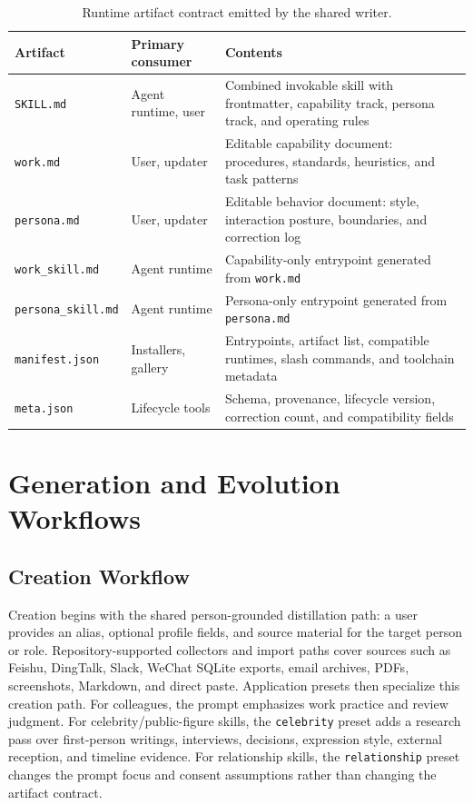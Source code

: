\documentclass{article}
\begin{document}
\begin{table}[t]
\centering
\small
\caption{Runtime artifact contract emitted by the shared writer.}
\label{tab:artifact-contract}
\begin{tabularx}{\textwidth}{@{}l l X@{}}
\toprule
Artifact & Primary consumer & Contents \\
\midrule
\texttt{SKILL.md} & Agent runtime, user & Combined invokable skill with frontmatter, capability track, persona track, and operating rules \\
\texttt{work.md} & User, updater & Editable capability document: procedures, standards, heuristics, and task patterns \\
\texttt{persona.md} & User, updater & Editable behavior document: style, interaction posture, boundaries, and correction log \\
\texttt{work\_skill.md} & Agent runtime & Capability-only entrypoint generated from \texttt{work.md} \\
\texttt{persona\_skill.md} & Agent runtime & Persona-only entrypoint generated from \texttt{persona.md} \\
\texttt{manifest.json} & Installers, gallery & Entrypoints, artifact list, compatible runtimes, slash commands, and toolchain metadata \\
\texttt{meta.json} & Lifecycle tools & Schema, provenance, lifecycle version, correction count, and compatibility fields \\
\bottomrule
\end{tabularx}
\end{table}

\section{Generation and Evolution Workflows}

\subsection{Creation Workflow}

Creation begins with the shared person-grounded distillation path: a user provides an alias, optional profile fields, and source material for the target person or role. Repository-supported collectors and import paths cover sources such as Feishu, DingTalk, Slack, WeChat SQLite exports, email archives, PDFs, screenshots, Markdown, and direct paste. Application presets then specialize this creation path. For colleagues, the prompt emphasizes work practice and review judgment. For celebrity/public-figure skills, the \texttt{celebrity} preset adds a research pass over first-person writings, interviews, decisions, expression style, external reception, and timeline evidence. For relationship skills, the \texttt{relationship} preset changes the prompt focus and consent assumptions rather than changing the artifact contract.
\end{document}

